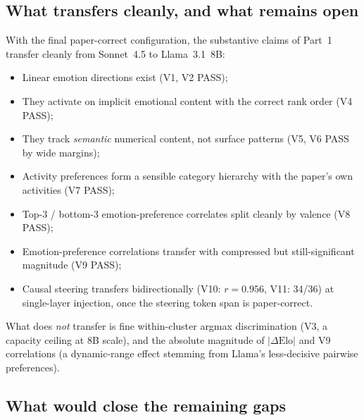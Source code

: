 \documentclass[11pt,a4paper]{article}
\begin{document}
\subsection{What transfers cleanly, and what remains open}

With the final paper-correct configuration, the substantive claims
of Part~1 transfer cleanly from Sonnet~4.5 to Llama~3.1~8B:
\begin{itemize}[nosep]
  \item Linear emotion directions exist (V1, V2 PASS);
  \item They activate on implicit emotional content with the correct
    rank order (V4 PASS);
  \item They track \emph{semantic} numerical content, not surface
    patterns (V5, V6 PASS by wide margins);
  \item Activity preferences form a sensible category hierarchy with
    the paper's own activities (V7 PASS);
  \item Top-3 / bottom-3 emotion-preference correlates split cleanly
    by valence (V8 PASS);
  \item Emotion-preference correlations transfer with compressed but
    still-significant magnitude (V9 PASS);
  \item Causal steering transfers bidirectionally
    (V10: $r{=}0.956$, V11: 34/36) at single-layer
    injection, once the steering token span is paper-correct.
\end{itemize}
What does \emph{not} transfer is fine within-cluster argmax
discrimination (V3, a capacity ceiling at 8B scale), and the
absolute magnitude of $|\Delta\text{Elo}|$ and V9 correlations (a
dynamic-range effect stemming from Llama's less-decisive pairwise
preferences).

\subsection{What would close the remaining gaps}
\end{document}
